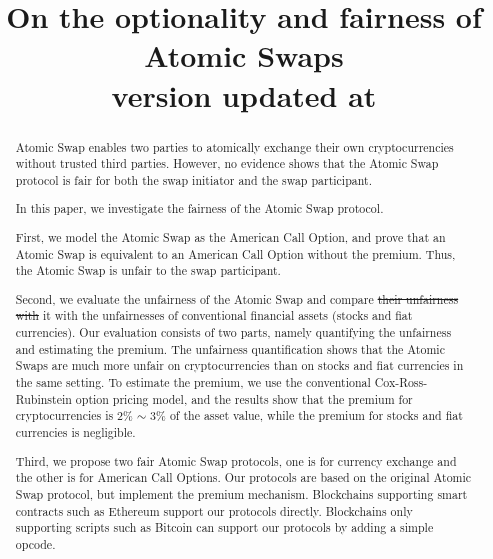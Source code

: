 \documentclass[sigconf, natbib=false]{acmart}
\renewcommand\_{\textunderscore\allowbreak}
\newcommand{\MOD}[1]{{\color{purple} #1}}
\begin{document}
\title{
    On the optionality and fairness of Atomic Swaps \\
    {\normalsize \normalfont version updated at \DTMnow }
}

\begin{abstract}
Atomic Swap enables two parties to atomically exchange their own cryptocurrencies without trusted third parties.
However, no evidence shows that the Atomic Swap protocol is fair for both the swap initiator and the swap participant.

In this paper, we investigate the fairness of the Atomic Swap protocol.

First, we model the Atomic Swap as the American Call Option,
and prove that an Atomic Swap is equivalent to an American Call Option without the premium.
Thus, the Atomic Swap is unfair to the swap participant.

Second, we evaluate the unfairness of the Atomic Swap and compare \MOD{\sout{their unfairness with} it with the unfairnesses of} conventional financial assets (stocks and fiat currencies).
Our evaluation consists of two parts, namely quantifying the unfairness and estimating the premium.
The unfairness quantification shows that the Atomic Swaps are much more unfair on cryptocurrencies than on stocks and fiat currencies in the same setting.
To estimate the premium, we use the conventional Cox-Ross-Rubinstein option pricing model, and the results show that the premium for cryptocurrencies is 2\% $\sim$ 3\% of the asset value, while the premium for stocks and fiat currencies is negligible.

Third, we propose two fair Atomic Swap protocols,
one is for currency exchange and the other is for American Call Options.
Our protocols are based on the original Atomic Swap protocol, but implement the premium mechanism.
Blockchains supporting smart contracts such as Ethereum support our protocols directly.
Blockchains only supporting scripts such as Bitcoin can support our protocols by adding a simple opcode.
\end{abstract}
\end{document}
